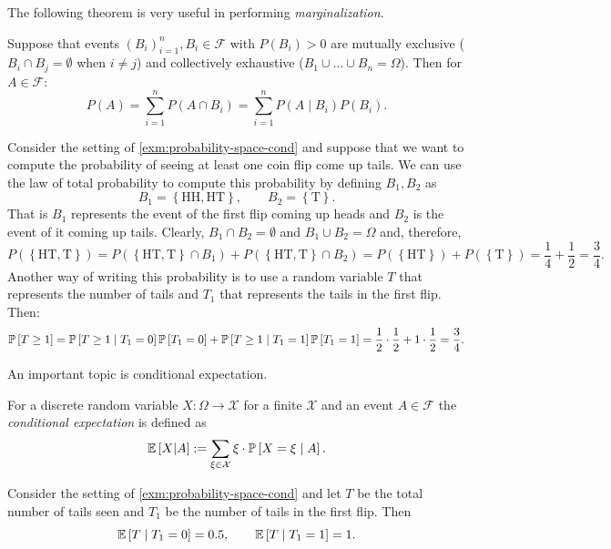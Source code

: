 \documentclass[letterpaper,11pt]{article}
\begin{document}
The following theorem is very useful in performing \emph{marginalization}.
\begin{theorem}
  Suppose that events $(B_i)_{i=1}^{n}, B_i\in \mathcal{F}$ with $P(B_i) > 0$ are mutually exclusive ($B_i \cap B_j = \emptyset$ when $i \neq j$) and collectively exhaustive ($B_1 \cup \dots \cup B_n = \Omega$). Then for $A\in \mathcal{F}$:
  \[
    P(A) 
    = \sum_{i = 1}^n P(A \cap B_i)
    = \sum_{i = 1}^n P(A \mid  B_i) P(B_i). 
  \]

\end{theorem}

\begin{example}\label{exm:coin-flip-tails}
Consider the setting of \cref{exm:probability-space-cond} and suppose that we want to compute the probability of seeing at least one coin flip come up tails. We can use the law of total probability to compute this probability by defining $B_1, B_2$ as
  \[
    B_1 = \left\{ \mathrm{HH, HT} \right\},
    \qquad
    B_2 = \left\{ \mathrm{T} \right\}.
  \]
  That is $B_1$ represents the event of the first flip coming up heads and $B_2$ is the event
  of it coming up tails. Clearly, $B_1 \cap B_2 = \emptyset$ and $B_1 \cup B_2 = \Omega$ and, therefore,
  \[
    P(\left\{ \mathrm{HT}, \mathrm{T} \right\} ) =
    P(\left\{ \mathrm{HT}, \mathrm{T} \right\} \cap B_1) + P(\left\{ \mathrm{HT}, \mathrm{T} \right\} \cap B_2) =
    P(\left\{ \mathrm{HT} \right\}) + P(\left\{ \mathrm{T} \right\}) = \frac{1}{4} + \frac{1}{2} = \frac{3}{4}.
  \]
  Another way of writing this probability is to use a random variable $T$ that represents the number of tails and $T_1$ that represents the tails in the first flip. Then:
  \[
    \P{T \ge 1} =  \P{T \ge 1 \mid T_1 = 0}\P{T_1 = 0} + \P{T \ge 1 \mid T_1 = 1}\P{T_1 = 1} =
    \frac{1}{2} \cdot \frac{1}{2} + 1 \cdot \frac{1}{2} = \frac{3}{4}.
  \]
  
\end{example}


An important topic is conditional expectation.
\begin{defn}
For a discrete random variable $X\colon \Omega \to \mathcal{X}$ for a finite $\mathcal{X}$ and an event $A\in \mathcal{F}$ the \emph{conditional expectation} is defined as
\[
  \E{X | A} :=
  \sum_{\xi \in \mathcal{X}} \xi \cdot \P{X = \xi \mid  A} .
\]
  
\end{defn}

\begin{example}
  Consider the setting of \cref{exm:probability-space-cond} and let $T$ be the total number of tails seen and $T_1$ be the number of tails in the first flip. Then
  \[
    \E{T \mid T_1 = 0} = 0.5,
    \qquad
    \E{T \mid T_1 = 1} = 1.
  \]
\end{example}
\end{document}
